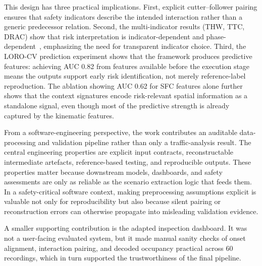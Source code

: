 \documentclass[12pt,a4paper,twoside,openright]{report}
\begin{document}
    This design has three practical implications. First, explicit cutter--follower pairing ensures that safety indicators describe the intended interaction rather than a generic predecessor relation. Second, the multi-indicator results (THW, TTC, DRAC) show that risk interpretation is indicator-dependent and phase-dependent~\cite{zhou2016riskperception,wang2021ssm}, emphasizing the need for transparent indicator choice. Third, the LORO-CV prediction experiment shows that the framework produces predictive features: achieving AUC 0.82 from features available before the execution stage means the outputs support early risk identification, not merely reference-label reproduction. The ablation showing AUC 0.62 for SFC features alone further shows that the context signatures encode risk-relevant spatial information as a standalone signal, even though most of the predictive strength is already captured by the kinematic features.

    From a software-engineering perspective, the work contributes an auditable data-processing and validation pipeline rather than only a traffic-analysis result. The central engineering properties are explicit input contracts, reconstructable intermediate artefacts, reference-based testing, and reproducible outputs. These properties matter because downstream models, dashboards, and safety assessments are only as reliable as the scenario extraction logic that feeds them. In a safety-critical software context, making preprocessing assumptions explicit is valuable not only for reproducibility but also because silent pairing or reconstruction errors can otherwise propagate into misleading validation evidence.

    A smaller supporting contribution is the adapted inspection dashboard. It was not a user-facing evaluated system, but it made manual sanity checks of onset alignment, interaction pairing, and decoded occupancy practical across 60 recordings, which in turn supported the trustworthiness of the final pipeline.
\end{document}
